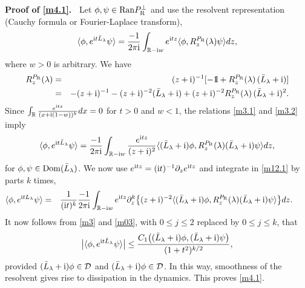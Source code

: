 \documentclass[letterpaper,onecolumn,11pt,accepted=2021-12-09]{quantumarticle}
\numberwithin{equation}{section}
\renewcommand{\r}{{\rm R}}
\renewcommand{\i}{{\rm i}}
\newcommand{\bbbone}{\mathchoice {\rm 1\mskip-4mu l} {\rm 1\mskip-4mu l}
	{\rm 1\mskip-4.5mu l} {\rm 1\mskip-5mu l}}
\begin{document}
{\bf Proof of \eqref{m4.1}.\ } Let $\phi,\psi\in {\rm Ran}P_\r^\perp$ and use the  resolvent representation (Cauchy formula or Fourier-Laplace transform),
\begin{equation}
\langle \phi, e^{\i t \bar L_\lambda}  \psi\rangle = \frac{-1}{2\pi\i} \int_{{\mathbb R}-\i w} e^{\i t z} \langle \phi, R^{P_\r}_z(\lambda)\psi\rangle dz,
\label{m3.1}
\end{equation}
where $w>0$ is arbitrary. We have 
\begin{eqnarray}
R_z^{P_\r}(\lambda) &=&(z+\i)^{-1}[-\bbbone +R_z^{P_\r}(\lambda)\, (\bar L_\lambda+\i)]\nonumber\\
&=& -(z+\i)^{-1} -(z+\i)^{-2}(\bar L_\lambda+\i) +(z+\i)^{-2} R_z^{P_\r}(\lambda)\, (\bar L_\lambda+\i)^2.
\label{m3.2}
\end{eqnarray}
Since $\int_{\mathbb R}\frac{e^{\i t x}}{(x+\i(1-w))^k}dx=0$ for $t>0$ and $w<1$, the relations \eqref{m3.1} and \eqref{m3.2} imply
\begin{equation}
\langle \phi, e^{\i t \bar L_\lambda}  \psi\rangle = \frac{-1}{2\pi\i} \int_{{\mathbb R}-\i w} \frac{e^{\i t z}}{(z+\i)^2} \langle (\bar L_\lambda+\i)\phi, R^{P_\r}_z(\lambda)(\bar L_\lambda+\i)\psi\rangle dz,
\label{m12.1}
\end{equation}
for $\phi,\psi\in{\rm Dom}(\bar L_\lambda)$. We now use $e^{\i t z} = (\i t)^{-1}\partial_z e^{\i t z}$ and integrate in \eqref{m12.1} by parts $k$ times,
\begin{eqnarray}
\langle \phi, e^{\i t L_\lambda}  \psi\rangle &=& \frac{1}{(\i t)^k} \frac{-1}{2\pi\i} \int_{{\mathbb R}-\i w} e^{\i t z} \partial^k_z\big\{  (z+\i)^{-2}\langle (\bar L_\lambda+\i) \phi, R_z^{P_\r}(\lambda)  (\bar L_\lambda+\i)\psi\rangle \big\}dz.\qquad 
\label{m3}
\end{eqnarray}
It now follows from \eqref{m3} and \eqref{m03}, with $0\le j\le 2$ replaced by $0\le j\le k$, that 
\begin{equation}
\big|\langle \phi, e^{\i t \bar L_\lambda} \psi\rangle\big| \le \frac{C_1\big((\bar L_\lambda+\i)\phi,(\bar L_\lambda+\i)\psi\big)}{(1+t^2)^{k/2}},
\label{m4}
\end{equation}
provided $(\bar L_\lambda+\i)\phi\in {\mathcal D}$ and $(\bar L_\lambda+\i)\phi\in{\mathcal D}$. 
In this way, smoothness of the resolvent gives rise to dissipation in the dynamics. This proves \eqref{m4.1}.
\end{document}

